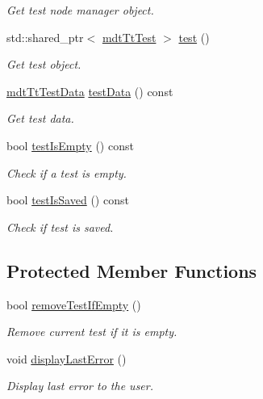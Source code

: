 \begin{DoxyCompactItemize}
\begin{DoxyCompactList}\small\item\em Get test node manager object. \end{DoxyCompactList}\item 
std\-::shared\-\_\-ptr$<$ \hyperlink{classmdt_tt_test}{mdt\-Tt\-Test} $>$ \hyperlink{classmdt_tt_abstract_test_widget_a2b3f3c63a7653e060c19d8aec5ef97cb}{test} ()
\begin{DoxyCompactList}\small\item\em Get test object. \end{DoxyCompactList}\item 
\hyperlink{classmdt_tt_test_data}{mdt\-Tt\-Test\-Data} \hyperlink{classmdt_tt_abstract_test_widget_a1bdf804c1d79fd89cdc098df3e476b15}{test\-Data} () const 
\begin{DoxyCompactList}\small\item\em Get test data. \end{DoxyCompactList}\item 
bool \hyperlink{classmdt_tt_abstract_test_widget_a9ab9cacab372743cfcc0ec02e8b1f70e}{test\-Is\-Empty} () const 
\begin{DoxyCompactList}\small\item\em Check if a test is empty. \end{DoxyCompactList}\item 
bool \hyperlink{classmdt_tt_abstract_test_widget_a769fc3cde057414ee89ee51183839433}{test\-Is\-Saved} () const 
\begin{DoxyCompactList}\small\item\em Check if test is saved. \end{DoxyCompactList}\end{DoxyCompactItemize}
\subsection*{Protected Member Functions}
\begin{DoxyCompactItemize}
\item 
bool \hyperlink{classmdt_tt_abstract_test_widget_a4dff81da38396b6e853b553cecb16d0b}{remove\-Test\-If\-Empty} ()
\begin{DoxyCompactList}\small\item\em Remove current test if it is empty. \end{DoxyCompactList}\item 
void \hyperlink{classmdt_tt_abstract_test_widget_a157d5cae7c4611dc27d698421f12f0fa}{display\-Last\-Error} ()
\begin{DoxyCompactList}\small\item\em Display last error to the user. \end{DoxyCompactList}\end{DoxyCompactItemize}
